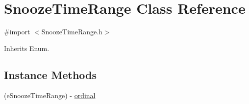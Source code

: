 \hypertarget{interface_snooze_time_range}{}\section{Snooze\+Time\+Range Class Reference}
\label{interface_snooze_time_range}


{\ttfamily \#import $<$Snooze\+Time\+Range.\+h$>$}



Inherits Enum.

\subsection*{Instance Methods}
\begin{DoxyCompactItemize}
\item 
(e\+Snooze\+Time\+Range) -\/ \hyperlink{interface_snooze_time_range_a63b0ad3d79848b077ee8c30467811e68}{ordinal}
\end{DoxyCompactItemize}
